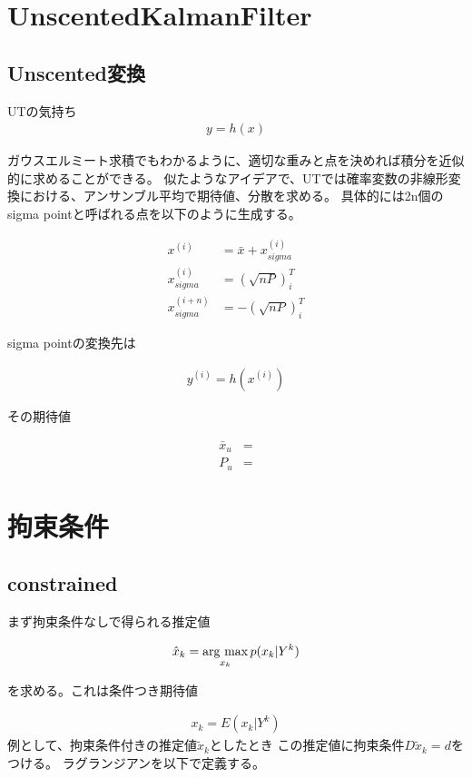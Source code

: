 \section{UnscentedKalmanFilter}
\subsection{Unscented変換}
UTの気持ち
\begin{align}
y=h(x)
\end{align}

ガウスエルミート求積でもわかるように、適切な重みと点を決めれば積分を近似的に求めることができる。
似たようなアイデアで、UTでは確率変数の非線形変換における、アンサンブル平均で期待値、分散を求める。
具体的には2n個のsigma pointと呼ばれる点を以下のように生成する。

\begin{align}
x^{(i)}&=\bar{x}+x_{sigma}^{(i)}  				\\
x_{sigma}^{(i)} &= (\sqrt{nP})_i^T 					\\
x_{sigma}^{(i+n)} &= -(\sqrt{nP})_i^T
\end{align}

sigma pointの変換先は

\begin{align}
y^{(i)} = h(x^{(i)})
\end{align}

その期待値

\begin{align}
\bar{x}_u&= 							\\
P_u&=
\end{align}




\section{拘束条件}

\subsection{constrained}
まず拘束条件なしで得られる推定値

\begin{align}
\hat{x}_k
=
\mathop{\rm arg~max}\limits_{x_k} p(x_k|Y^k)
\end{align}

を求める。これは条件つき期待値

\begin{align}
x_k=E(x_k|Y^k)
\end{align}
例として、拘束条件付きの推定値$\tilde{x}_k$としたとき
この推定値に拘束条件$D\tilde{x}_k=d$をつける。
ラグランジアンを以下で定義する。

